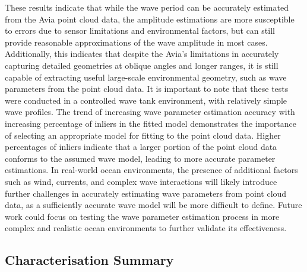 These results indicate that while the wave period can be accurately estimated from the Avia point cloud data, the amplitude estimations are more susceptible to errors due to sensor limitations and environmental factors, but can still provide reasonable approximations of the wave amplitude in most cases. Additionally, this indicates that despite the Avia's limitations in accurately capturing detailed geometries at oblique angles and longer ranges, it is still capable of extracting useful large-scale environmental geometry, such as wave parameters from the point cloud data. It is important to note that these tests were conducted in a controlled wave tank environment, with relatively simple wave profiles. The trend of increasing wave parameter estimation accuracy with increasing percentage of inliers in the fitted model demonstrates the importance of selecting an appropriate model for fitting to the point cloud data. Higher percentages of inliers indicate that a larger portion of the point cloud data conforms to the assumed wave model, leading to more accurate parameter estimations. In real-world ocean environments, the presence of additional factors such as wind, currents, and complex wave interactions will likely introduce further challenges in accurately estimating wave parameters from point cloud data, as a sufficiently accurate wave model will be more difficult to define. Future work could focus on testing the wave parameter estimation process in more complex and realistic ocean environments to further validate its effectiveness.

\subsection{Characterisation Summary}
\label{subsec:ch8.section1.subsec4}

